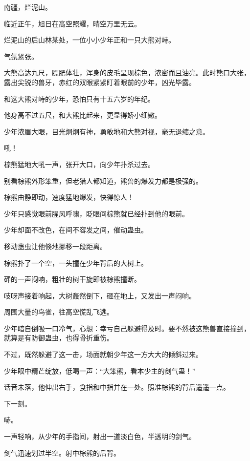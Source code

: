 
\begin{this_body}



南疆，烂泥山。

临近正午，旭日在高空照耀，晴空万里无云。

烂泥山的后山林某处，一位小小少年正和一只大熊对峙。

气氛紧张。

大熊高达九尺，膘肥体壮，浑身的皮毛呈现棕色，浓密而且油亮。此时熊口大张，露出尖锐的兽牙，赤红的双眼紧紧盯着眼前的少年，凶光毕露。

和这大熊对峙的少年，恐怕只有十五六岁的年纪。

他身高不过五尺，和大熊比起来，更显得娇小细嫩。

少年浓眉大眼，目光炯炯有神，勇敢地和大熊对视，毫无退缩之意。

吼！

棕熊猛地大吼一声，张开大口，向少年扑杀过去。

别看棕熊外形笨重，但老猎人都知道，熊兽的爆发力都是极强的。

棕熊由静即动，速度猛地爆发，快得惊人！

少年只感觉眼前腥风呼啸，眨眼间棕熊就已经扑到他的眼前。

少年却面不改色，在间不容发之间，催动蛊虫。

移动蛊虫让他倏地挪移一段距离。

棕熊扑了一个空，一头撞在少年背后的大树上。

砰的一声闷响，粗壮的树干旋即被棕熊撞断。

吱呀声接着响起，大树轰然倒下，砸在地上，又发出一声闷响。

周围大量的鸟雀，往高空慌乱飞逃。

少年暗自倒吸一口冷气，心想：幸亏自己躲避得及时。要不然被这熊兽直接撞到，就算是有防御蛊虫，也得骨折重伤。

不过，既然躲避了这一击，场面就朝少年这一方大大的倾斜过来。

少年眼中精芒绽放，低喝一声：“大笨熊，看本少主的剑气蛊！”

话音未落，他伸出右手，食指和中指并在一处。照准棕熊的背后遥遥一点。

下一刻。

哧。

一声轻响，从少年的手指间，射出一道淡白色，半透明的剑气。

剑气迅速划过半空。射中棕熊的后背。


\end{this_body}
